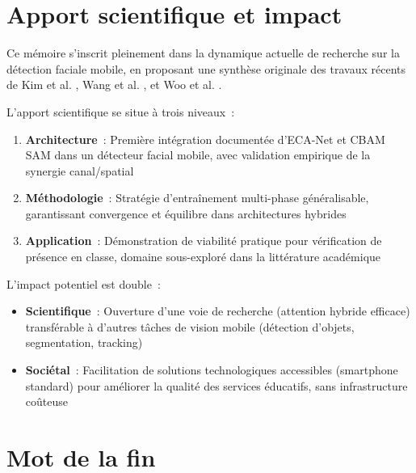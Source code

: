 \begin{onehalfspace}
\section*{Apport scientifique et impact}

\hspace{0.65 cm}Ce mémoire s'inscrit pleinement dans la dynamique actuelle de recherche sur la détection faciale mobile, en proposant une synthèse originale des travaux récents de Kim et al. \cite{Kim2025FeatherFace}, Wang et al. \cite{Wang2020ECANet, Wang2024ECACBAM}, et Woo et al. \cite{Woo2018CBAM}.

\hspace{0.65 cm}L'apport scientifique se situe à trois niveaux~:

\begin{enumerate}
\item \textbf{Architecture}~: Première intégration documentée d'ECA-Net et CBAM SAM dans un détecteur facial mobile, avec validation empirique de la synergie canal/spatial

\item \textbf{Méthodologie}~: Stratégie d'entraînement multi-phase généralisable, garantissant convergence et équilibre dans architectures hybrides

\item \textbf{Application}~: Démonstration de viabilité pratique pour vérification de présence en classe, domaine sous-exploré dans la littérature académique
\end{enumerate}

\hspace{0.65 cm}L'impact potentiel est double~:

\begin{itemize}
\item \textbf{Scientifique}~: Ouverture d'une voie de recherche (attention hybride efficace) transférable à d'autres tâches de vision mobile (détection d'objets, segmentation, tracking)

\item \textbf{Sociétal}~: Facilitation de solutions technologiques accessibles (smartphone standard) pour améliorer la qualité des services éducatifs, sans infrastructure coûteuse
\end{itemize}

\section*{Mot de la fin}


\end{onehalfspace}
